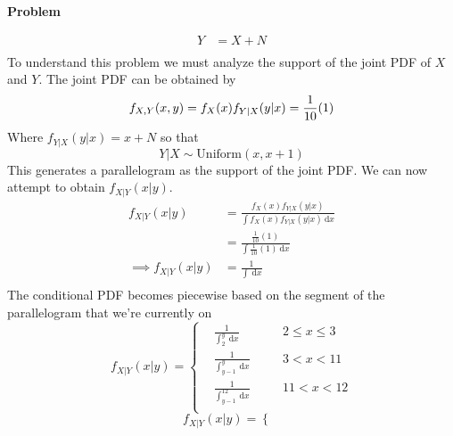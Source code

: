 \documentclass[12pt]{article}
\newenvironment{Ex}{\textbf{Problem}\vspace{.75em}\\}{}
\newcommand{\dd}[1]{\:\mathrm{d}{#1}}
\begin{document}
\begin{enumerate}
\begin{Ex}
\begin{solution}
\begin{enumerate}
\begin{equation}
\begin{aligned}
            Y&=X+N \\
          \end{aligned}
        \end{equation}
        To understand this problem we must analyze the support of the
        joint PDF of $X$ and $Y$. The joint PDF can be obtained by
        \begin{equation}
          \label{eq:3a-joint-pdf}
          f_{X,Y}(x,y) = f_{X}(x)f_{Y|X}(y|x) = \frac{1}{10}(1) \\
        \end{equation}
        Where $f_{Y|X}(y|x)=x+N$ so that
        \begin{equation}
          \label{eq:3a-y-given-x-def}
          Y|X\sim\text{Uniform}(x,x+1)
        \end{equation}
        This generates a parallelogram as the support of the joint
        PDF. We can now attempt to obtain $f_{X|Y}(x|y)$.
        \begin{equation}
          \label{eq:3a-x-given-y-attempt}
          \begin{aligned}
            f_{X|Y}(x|y) &= \frac{f_X(x)f_{Y|X}(y|x)}
            {\int f_X(x)f_{Y|X}(y|x)\dd{x}} \\
            &= \frac{\frac{1}{10} (1)}{\int \frac{1}{10}(1)\dd{x}} \\
            \implies f_{X|Y}(x|y) &= \frac{1}{\int \dd{x}} \\
          \end{aligned}
        \end{equation}
        The conditional PDF becomes piecewise based on the segment of
        the parallelogram that we're currently on
        \begin{equation}
          \label{eq:3a-x-given-y-piecewise}
          f_{X|Y}(x|y) = \left\{
            \begin{aligned}
              & \frac{1}{\int_2^y\dd{x}} &&\quad 2 \le x \le 3 \\
              & \frac{1}{\int_{y-1}^{y}\dd{x}} &&\quad 3 < x < 11 \\
              & \frac{1}{\int_{y-1}^{12}\dd{x}} &&\quad 11 < x < 12 \\
            \end{aligned} \right.
        \end{equation}
        \begin{equation}
          \label{eq:3a-x-given-y-piecewise}
          f_{X|Y}(x|y) = \left\{
            \begin{aligned}

\end{aligned}
\end{equation}
\end{enumerate}
\end{solution}
\end{Ex}
\end{enumerate}
\end{document}
